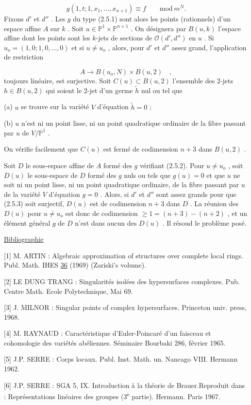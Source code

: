 \begin{equation}\tag{2.5.2}
g(1,t ; 1,x_1,\ldots,x_{n+1}) \equiv f \qquad \mathrm{mod}\ m^N .
\end{equation}
Fixons $d'$ et $d''$ . Les $g$ du type (2.5.1) sont alors les points (rationnels) d'un espace affine $A$ sur $k$ . Soit $u \in \mathbb{P}^1 \times \mathbb{P}^{n+1}$ . On désignera par $B(u,k)$ l'espace affine dont les points sont les $k$-jets de sections de $\mathcal{O}(d',d'')$ en $u$ . Si $u_o = (1,0;1,0,\ldots,0)$ et si $u \neq u_o$ , alors, pour $d'$ et $d''$ assez grand, l'application de restriction

\begin{equation}\tag{2.5.3}
A \to B(u_o,N) \times B(u,2) \quad ,
\end{equation}
toujours linéaire, est surjective. Soit $C(u) \subset B(u,2)$ l'ensemble des 2-jets $h \in B(u,2)$ qui soient le 2-jet d'un germe $\tilde{h}$ nul ou tel que

(a) $u$ se trouve sur la variété $V$ d'équation $\tilde{h} = 0$ ;

(b) $u$ n'est ni un point lisse, ni un point quadratique ordinaire de la fibre passant par $u$ de $V/\mathbb{P}^1$ .

On vérifie facilement que $C(u)$ est fermé de codimension $n + 3$ dans $B(u,2)$ .

Soit $D$ le sous-espace affine de $A$ formé des $g$ vérifiant (2.5.2). Pour $u \neq u_o$ , soit $D(u)$ le sous-espace de $D$ formé des $g$ nuls ou tels que $g(u) = 0$ et que $u$ ne soit ni un point lisse, ni un point quadratique ordinaire, de la fibre passant par $u$ de la variété $V$ d'équation $g = 0$ . Alors, si $d'$ et $d''$ sont assez grands pour que (2.5.3) soit surjectif, $D(u)$ est de codimension $n+3$ dans $D$ . La réunion des $D(u)$ pour $u \neq u_o$ est donc de codimension $\geq 1 = (n+3) - (n+2)$ , et un élément général $g$ de $D$ n'est dans aucun des $D(u)$ . Il résoud le problème posé.




\underline{Bibliographie}

[1] M. ARTIN : Algebraic approximation of structures over complete local rings. Publ. Math. IHES \underline{36} (1969) (Zariski's volume).

[2] LE DUNG TRANG : Singularités isolées des hypersurfaces complexes. Pub. Centre Math. Ecole Polytechnique, Mai 69.

[3] J. MILNOR : Singular points of complex hypersurfaces. Princeton univ. press, 1968.

[4] M. RAYNAUD : Caractéristique d'Euler-Poincaré d'un faisceau et cohomologie des variétés abéliennes. Séminaire Bourbaki 286, février 1965.

[5] J.P. SERRE : Corps locaux. Publ. Inst. Math. un. Nancago VIII. Hermann 1962.

[6] J.P. SERRE : SGA 5, IX. Introduction à la théorie de Brauer.Reproduit dans : Représentations linéaires des groupes (3\textsuperscript{e} partie). Hermann. Paris 1967.
